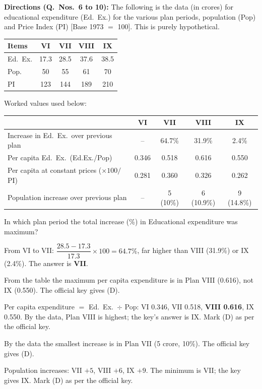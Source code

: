\textbf{Directions (Q.~Nos.~6 to 10):} The following is the data (in crores) for educational expenditure (Ed.\ Ex.) for the various plan periods, population (Pop) and Price Index (PI) [Base 1973 $=$ 100]. This is purely hypothetical.
\begin{center}\small
\begin{tabular}{lcccc}\toprule \textbf{Items} & \textbf{VI} & \textbf{VII} & \textbf{VIII} & \textbf{IX}\\\midrule
Ed.\ Ex. & 17.3 & 28.5 & 37.6 & 38.5\\ Pop. & 50 & 55 & 61 & 70\\ PI & 123 & 144 & 189 & 210\\\bottomrule
\end{tabular}
\end{center}
Worked values used below:
\begin{center}\small
\begin{tabular}{lcccc}\toprule & \textbf{VI} & \textbf{VII} & \textbf{VIII} & \textbf{IX}\\\midrule
Increase in Ed.\ Ex.\ over previous plan & -- & 64.7\% & 31.9\% & 2.4\%\\
Per capita Ed.\ Ex.\ (Ed.Ex./Pop) & 0.346 & 0.518 & 0.616 & 0.550\\
Per capita at constant prices ($\times100/$PI) & 0.281 & 0.360 & 0.326 & 0.262\\
Population increase over previous plan & -- & 5 (10\%) & 6 (10.9\%) & 9 (14.8\%)\\\bottomrule
\end{tabular}
\end{center}

In which plan period the total increase (\%) in Educational expenditure was maximum?

From VI to VII: $\dfrac{28.5-17.3}{17.3}\times100=64.7\%$, far higher than VIII (31.9\%) or IX (2.4\%). The answer is \textbf{VII}.

From the table the maximum per capita expenditure is in Plan VIII (0.616), not IX (0.550). The official key gives (D).

Per capita expenditure $=$ Ed.\ Ex.\ $\div$ Pop: VI 0.346, VII 0.518, \textbf{VIII 0.616}, IX 0.550. By the data, Plan VIII is highest; the key's answer is IX. Mark (D) as per the official key.

By the data the smallest increase is in Plan VII (5 crore, 10\%). The official key gives (D).

Population increases: VII $+5$, VIII $+6$, IX $+9$. The minimum is VII; the key gives IX. Mark (D) as per the official key.

